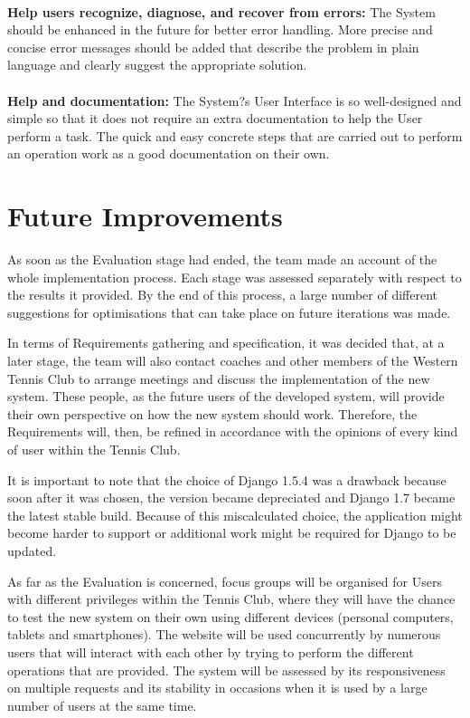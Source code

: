 \documentclass{l3proj}
\begin{document}
 \\
\textbf{Help users recognize, diagnose, and recover from errors:}
The System should be enhanced in the future for better error handling. More precise and concise error messages should be added that describe the problem in plain language and clearly suggest the appropriate solution.\\
 \\
\textbf{Help and documentation:}
The System?s User Interface is so well-designed and simple so that it does not require an extra documentation to help the User perform a task. The quick and easy concrete steps that are carried out to perform an operation work as a good documentation on their own.\\

\section{Future Improvements}
As soon as the Evaluation stage had ended, the team made an account of the whole implementation process. Each stage was assessed separately with respect to the results it provided. By the end of this process, a large number of different suggestions for optimisations that can take place on future iterations was made.\\
\par In terms of Requirements gathering and specification, it was decided that, at a later stage, the team will also contact coaches and other members of the Western Tennis Club to arrange meetings and discuss the implementation of the new system. These people, as the future users of the developed system, will provide their own perspective on how the new system should work. Therefore, the Requirements will, then, be refined in accordance with the opinions of every kind of user within the Tennis Club.\\
\par It is important to note that the choice of Django 1.5.4 was a drawback because soon after it was chosen, the version became depreciated and Django 1.7 became the latest stable build. Because of this miscalculated choice, the application might become harder to support or additional work might be required for Django to be updated.\\
\par As far as the Evaluation is concerned, focus groups will be organised for Users with different privileges within the Tennis Club, where they will have the chance to test the new system on their own using different devices (personal computers, tablets and smartphones). The website will be used concurrently by numerous users that will interact with each other by trying to perform the different operations that are provided.  The system will be assessed by its responsiveness on multiple requests and its stability in occasions when it is used by a large number of users at the same time.
\end{document}
